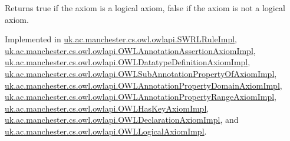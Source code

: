 \begin{DoxyReturn}{Returns}
{\ttfamily true} if the axiom is a logical axiom, {\ttfamily false} if the axiom is not a logical axiom. 
\end{DoxyReturn}


Implemented in \hyperlink{classuk_1_1ac_1_1manchester_1_1cs_1_1owl_1_1owlapi_1_1_s_w_r_l_rule_impl_acd38e231b636d7e3abb59237601b4ed8}{uk.\-ac.\-manchester.\-cs.\-owl.\-owlapi.\-S\-W\-R\-L\-Rule\-Impl}, \hyperlink{classuk_1_1ac_1_1manchester_1_1cs_1_1owl_1_1owlapi_1_1_o_w_l_annotation_assertion_axiom_impl_ae8422c31db94b7db030c69454138de4d}{uk.\-ac.\-manchester.\-cs.\-owl.\-owlapi.\-O\-W\-L\-Annotation\-Assertion\-Axiom\-Impl}, \hyperlink{classuk_1_1ac_1_1manchester_1_1cs_1_1owl_1_1owlapi_1_1_o_w_l_datatype_definition_axiom_impl_a40fd41b777ba1538aeafcec96fce8a99}{uk.\-ac.\-manchester.\-cs.\-owl.\-owlapi.\-O\-W\-L\-Datatype\-Definition\-Axiom\-Impl}, \hyperlink{classuk_1_1ac_1_1manchester_1_1cs_1_1owl_1_1owlapi_1_1_o_w_l_sub_annotation_property_of_axiom_impl_a917543524d478e15a110508052376c2d}{uk.\-ac.\-manchester.\-cs.\-owl.\-owlapi.\-O\-W\-L\-Sub\-Annotation\-Property\-Of\-Axiom\-Impl}, \hyperlink{classuk_1_1ac_1_1manchester_1_1cs_1_1owl_1_1owlapi_1_1_o_w_l_annotation_property_domain_axiom_impl_a8358783b54752de8d28e3c16a46365c8}{uk.\-ac.\-manchester.\-cs.\-owl.\-owlapi.\-O\-W\-L\-Annotation\-Property\-Domain\-Axiom\-Impl}, \hyperlink{classuk_1_1ac_1_1manchester_1_1cs_1_1owl_1_1owlapi_1_1_o_w_l_annotation_property_range_axiom_impl_a27a4ac029a91a2ae447abb768c0ae6a5}{uk.\-ac.\-manchester.\-cs.\-owl.\-owlapi.\-O\-W\-L\-Annotation\-Property\-Range\-Axiom\-Impl}, \hyperlink{classuk_1_1ac_1_1manchester_1_1cs_1_1owl_1_1owlapi_1_1_o_w_l_has_key_axiom_impl_a6f17eadcf14347cf01ee1c6def401a96}{uk.\-ac.\-manchester.\-cs.\-owl.\-owlapi.\-O\-W\-L\-Has\-Key\-Axiom\-Impl}, \hyperlink{classuk_1_1ac_1_1manchester_1_1cs_1_1owl_1_1owlapi_1_1_o_w_l_declaration_axiom_impl_a4059e01e3885f03615aca6b7e3e6e5ec}{uk.\-ac.\-manchester.\-cs.\-owl.\-owlapi.\-O\-W\-L\-Declaration\-Axiom\-Impl}, and \hyperlink{classuk_1_1ac_1_1manchester_1_1cs_1_1owl_1_1owlapi_1_1_o_w_l_logical_axiom_impl_a27f35b5bf1f20862b5ac1e71f622dded}{uk.\-ac.\-manchester.\-cs.\-owl.\-owlapi.\-O\-W\-L\-Logical\-Axiom\-Impl}.

